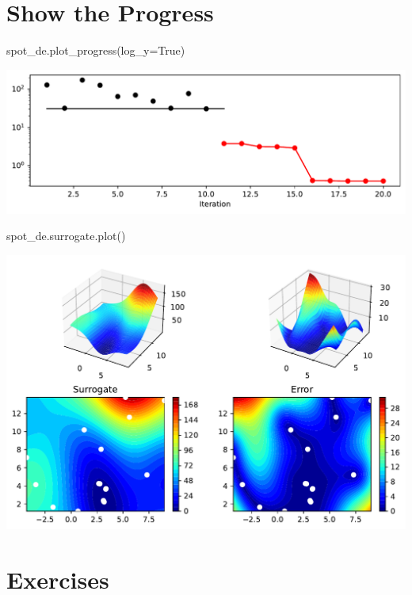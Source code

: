 \documentclass[
  letterpaper,
  DIV=11,
  numbers=noendperiod]{scrreprt}
\newenvironment{Shaded}{\begin{snugshade}}{\end{snugshade}}
\newcommand{\NormalTok}[1]{\textcolor[rgb]{0.00,0.23,0.31}{#1}}
\newcommand{\OperatorTok}[1]{\textcolor[rgb]{0.37,0.37,0.37}{#1}}
\newcommand{\VariableTok}[1]{\textcolor[rgb]{0.07,0.07,0.07}{#1}}
\begin{document}
\section{Show the Progress}\label{show-the-progress}

\begin{Shaded}
\begin{Highlighting}[]
\NormalTok{spot\_de.plot\_progress(log\_y}\OperatorTok{=}\VariableTok{True}\NormalTok{)}
\end{Highlighting}
\end{Shaded}

\includegraphics{004_spot_sklearn_optimization_files/figure-pdf/cell-7-output-1.pdf}

\begin{Shaded}
\begin{Highlighting}[]
\NormalTok{spot\_de.surrogate.plot()}
\end{Highlighting}
\end{Shaded}

\includegraphics{004_spot_sklearn_optimization_files/figure-pdf/cell-8-output-1.pdf}

\section{Exercises}\label{exercises}
\end{document}
